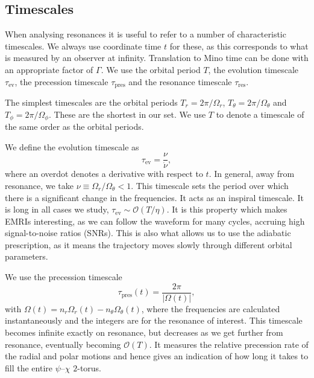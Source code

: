 \documentclass[aps,prd,amsfonts,amssymb,amsmath,nofootinbib,showpacs,superscriptaddress,twocolumn,floatfix]{revtex4-1}
\newcommand{\sub}[1]{\ensuremath{_\mathrm{#1}}}
\newcommand{\order}[1]{\ensuremath{\mathcal{O}({#1})}}
\begin{document}
\subsection{Timescales}\label{sec:res-time}

When analysing resonances it is useful to refer to a number of characteristic timescales.  We always use coordinate time $t$ for these, as this corresponds to what is measured by an observer at infinity. Translation to Mino time can be done with an appropriate factor of $\Gamma$. We use the orbital period $T$, the evolution timescale $\tau\sub{ev}$, the precession timescale $\tau\sub{pres}$ and the resonance timescale $\tau\sub{res}$.

The simplest timescales are the orbital periods $T_r = 2\pi/\Omega_r$, $T_\theta = 2\pi/\Omega_\theta$ and $T_\phi = 2\pi/\Omega_\phi$. These are the shortest in our set. We use $T$ to denote a timescale of the same order as the orbital periods.

We define the evolution timescale as
\begin{equation}
\tau\sub{ev} = \frac{\nu}{\dot{\nu}},
\end{equation}
where an overdot denotes a derivative with respect to $t$. In general, away from resonance, we take $\nu \equiv \Omega_r/\Omega_\theta < 1$. This timescale sets the period over which there is a significant change in the frequencies. It acts as an inspiral timescale. It is long in all cases we study, $\tau\sub{ev} \sim \order{T/\eta}$. It is this property which makes EMRIs interesting, as we can follow the waveform for many cycles, accruing high signal-to-noise ratios (SNRs). This is also what allows us to use the adiabatic prescription, as it means the trajectory moves slowly through different orbital parameters.

We use the precession timescale
\begin{equation}
\tau\sub{pres}(t) = \frac{2\pi}{|\Omega(t)|},
\label{eq:t-pres}
\end{equation}
with $\Omega(t) = n_r \Omega_r(t) - n_\theta \Omega_\theta(t)$, where the frequencies are calculated instantaneously and the integers are for the resonance of interest. This timescale becomes infinite exactly on resonance, but decreases as we get further from resonance, eventually becoming $\order{T}$. It measures the relative precession rate of the radial and polar motions and hence gives an indication of how long it takes to fill the entire $\psi$--$\chi$ $2$-torus.
\end{document}
